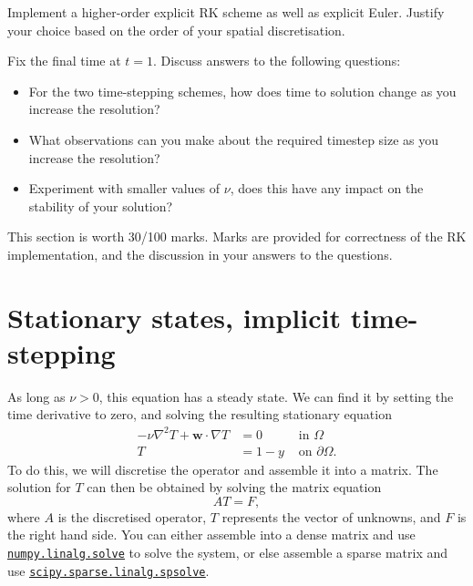 \documentclass[11pt,a4paper]{article}
\renewcommand{\vec}[1]{\ensuremath{\mathbf{#1}}}
\begin{document}
Implement a higher-order explicit RK scheme as well as explicit Euler.
Justify your choice based on the order of your spatial discretisation.

Fix the final time at $t = 1$. Discuss answers to the following
questions:

\begin{itemize}
\item For the two time-stepping schemes, how does time to solution
  change as you increase the resolution?
\item What observations can you make about the required timestep size
  as you increase the resolution?
\item Experiment with smaller values of $\nu$, does this have any
  impact on the stability of your solution?
\end{itemize}

This section is worth 30/100 marks. Marks are provided for
correctness of the RK implementation, and the discussion in your
answers to the questions.

\section{Stationary states, implicit time-stepping}
\label{sec:part3}
As long as $\nu > 0$, this equation has a steady state. We can find it
by setting the time derivative to zero, and solving the resulting
stationary equation
\begin{equation}
  \label{eq:4}
  \begin{aligned}
  -\nu \nabla^2 T + \vec{w} \cdot \nabla T &= 0 &\text{ in } \Omega\\
  T &= 1 - y &\text{ on } \partial\Omega.
  \end{aligned}
\end{equation}
To do this, we will discretise the operator and assemble it into a
matrix. The solution for $T$ can then be obtained by solving the
matrix equation
\begin{equation}
  \label{eq:5}
  A T = F,
\end{equation}
where $A$ is the discretised operator, $T$ represents the vector of
unknowns, and $F$ is the right hand side. You can either assemble into
a dense matrix and use \href{https://docs.scipy.org/doc/numpy/reference/generated/numpy.linalg.solve.html}{\underline{\texttt{numpy.linalg.solve}}} to solve the
system, or else assemble a sparse matrix and use
\href{https://docs.scipy.org/doc/scipy/reference/sparse.linalg.html}{\underline{\texttt{scipy.sparse.linalg.spsolve}}}.
\end{document}
